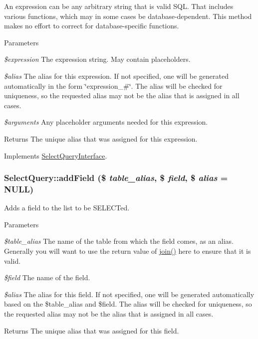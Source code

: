 An expression can be any arbitrary string that is valid SQL. That includes various functions, which may in some cases be database-\/dependent. This method makes no effort to correct for database-\/specific functions.


\begin{DoxyParams}{Parameters}
\item[{\em \$expression}]The expression string. May contain placeholders. \item[{\em \$alias}]The alias for this expression. If not specified, one will be generated automatically in the form \char`\"{}expression\_\-\#\char`\"{}. The alias will be checked for uniqueness, so the requested alias may not be the alias that is assigned in all cases. \item[{\em \$arguments}]Any placeholder arguments needed for this expression. \end{DoxyParams}
\begin{DoxyReturn}{Returns}
The unique alias that was assigned for this expression. 
\end{DoxyReturn}


Implements \hyperlink{interfaceSelectQueryInterface_a85b30bde2daad80cb614d7d1f5b8dae3}{SelectQueryInterface}.\hypertarget{classSelectQuery_a8f5cef012b0f3111a5e6b8bcc47bacea}{
\subsubsection[{addField}]{\setlength{\rightskip}{0pt plus 5cm}SelectQuery::addField (\$ {\em table\_\-alias}, \/  \$ {\em field}, \/  \$ {\em alias} = {\ttfamily NULL})}}
\label{classSelectQuery_a8f5cef012b0f3111a5e6b8bcc47bacea}
Adds a field to the list to be SELECTed.


\begin{DoxyParams}{Parameters}
\item[{\em \$table\_\-alias}]The name of the table from which the field comes, as an alias. Generally you will want to use the return value of \hyperlink{classSelectQuery_aceff7fc4040a74f693f2fc2548a99c17}{join()} here to ensure that it is valid. \item[{\em \$field}]The name of the field. \item[{\em \$alias}]The alias for this field. If not specified, one will be generated automatically based on the \$table\_\-alias and \$field. The alias will be checked for uniqueness, so the requested alias may not be the alias that is assigned in all cases. \end{DoxyParams}
\begin{DoxyReturn}{Returns}
The unique alias that was assigned for this field. 
\end{DoxyReturn}


